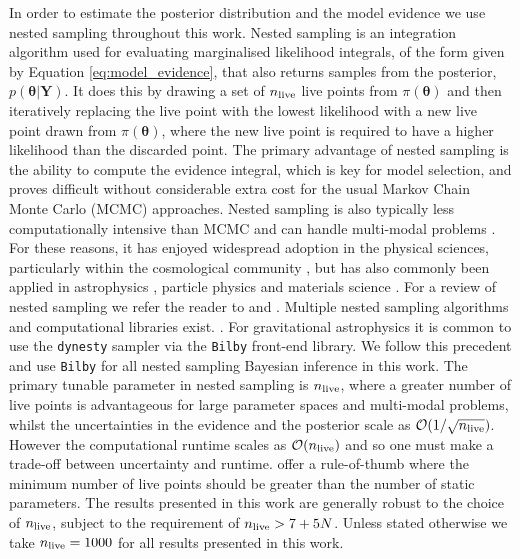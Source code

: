 \documentclass[fleqn,usenatbib,useAMS]{mnras}
\begin{document}
In order to estimate the posterior distribution and the model evidence we use nested sampling \citep{Skilling} throughout this work. Nested sampling is an integration algorithm used for evaluating marginalised likelihood integrals, of the form given by Equation \eqref{eq:model_evidence}, that also returns samples from the posterior, $p(\boldsymbol{\theta} | \boldsymbol{Y})$. It does this by drawing a set of $n_{\rm live}$ live points from $\pi(\boldsymbol{\theta})$ and then iteratively replacing the live point with the lowest likelihood with a new live point drawn from $\pi(\boldsymbol{\theta})$, where the new live point is required to have a higher likelihood than the discarded point. The primary advantage of nested sampling is the ability to compute the evidence integral, which is key for model selection, and proves difficult without considerable extra cost for the usual Markov Chain Monte Carlo (MCMC) approaches. Nested sampling is also typically less computationally intensive than MCMC and can handle multi-modal problems \citep{Ashton2022}. For these reasons, it has enjoyed widespread adoption in the physical sciences, particularly within the cosmological community \citep{Mukherjee2006,Feroz2008,Handley2015}, but has also commonly been applied in astrophysics \citep{UltraNest2021}, particle physics \citep{proceedings2019033014} and materials science \citep{2009arXiv0906materials}. For a review of nested sampling we refer the reader to \cite{Buchner2021} and \cite{Ashton2022}. Multiple nested sampling algorithms and computational libraries exist. \citep[e.g.][]{Feroz2008,Feroz2009,Handley2015,dynesty2020,UltraNest2021}. For gravitational astrophysics it is common to use the \texttt{dynesty} sampler \citep{dynesty2020} via the \texttt{Bilby} \citep{bilby.507.2037A} front-end library. We  follow this precedent and use \texttt{Bilby} for all nested sampling Bayesian inference in this work. The primary tunable parameter in nested sampling is $n_{\rm live}$, where a greater number of live points is advantageous for large parameter spaces and multi-modal problems, whilst the uncertainties in the evidence and the posterior scale as $\mathcal{O}(1/\sqrt{n_{\rm live}})$. However the computational runtime scales as $\mathcal{O}(n_{\rm live})$ and so one must make a trade-off between uncertainty and runtime. \cite{Ashton2022} offer a rule-of-thumb where the minimum number of live points should be greater than the number of static parameters. The results presented in this work are generally robust to the choice of $n_{\rm live}$, subject to the requirement of $n_{\rm live} > 7 + 5N$. Unless stated otherwise we take $n_{\rm live} = 1000$ for all results presented in this work. \newline 
\end{document}
